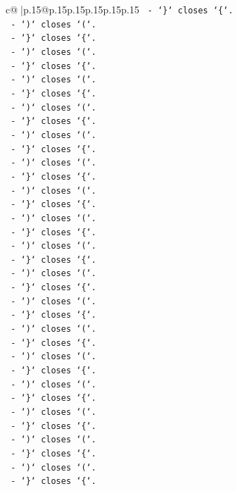 \documentclass{article}
\begin{document}
{\begin{supertabular}{c@{$\;$}|p{.15\linewidth}@{}p{.15\linewidth}p{.15\linewidth}p{.15\linewidth}p{.15\linewidth}p{.15\linewidth}}
{{{\texttt{   {-} `\}` closes `\{`.} \\
\texttt{   {-} `)` closes `(`.} \\
\texttt{   {-} `\}` closes `\{`.} \\
\texttt{   {-} `)` closes `(`.} \\
\texttt{   {-} `\}` closes `\{`.} \\
\texttt{   {-} `)` closes `(`.} \\
\texttt{   {-} `\}` closes `\{`.} \\
\texttt{   {-} `)` closes `(`.} \\
\texttt{   {-} `\}` closes `\{`.} \\
\texttt{   {-} `)` closes `(`.} \\
\texttt{   {-} `\}` closes `\{`.} \\
\texttt{   {-} `)` closes `(`.} \\
\texttt{   {-} `\}` closes `\{`.} \\
\texttt{   {-} `)` closes `(`.} \\
\texttt{   {-} `\}` closes `\{`.} \\
\texttt{   {-} `)` closes `(`.} \\
\texttt{   {-} `\}` closes `\{`.} \\
\texttt{   {-} `)` closes `(`.} \\
\texttt{   {-} `\}` closes `\{`.} \\
\texttt{   {-} `)` closes `(`.} \\
\texttt{   {-} `\}` closes `\{`.} \\
\texttt{   {-} `)` closes `(`.} \\
\texttt{   {-} `\}` closes `\{`.} \\
\texttt{   {-} `)` closes `(`.} \\
\texttt{   {-} `\}` closes `\{`.} \\
\texttt{   {-} `)` closes `(`.} \\
\texttt{   {-} `\}` closes `\{`.} \\
\texttt{   {-} `)` closes `(`.} \\
\texttt{   {-} `\}` closes `\{`.} \\
\texttt{   {-} `)` closes `(`.} \\
\texttt{   {-} `\}` closes `\{`.} \\
\texttt{   {-} `)` closes `(`.} \\
\texttt{   {-} `\}` closes `\{`.} \\
\texttt{   {-} `)` closes `(`.} \\
\texttt{   {-} `\}` closes `\{`.} \\
}}}
\end{supertabular}}
\end{document}
